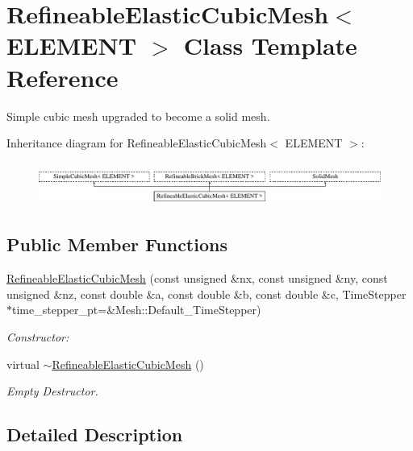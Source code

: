 \hypertarget{classRefineableElasticCubicMesh}{}\section{Refineable\+Elastic\+Cubic\+Mesh$<$ E\+L\+E\+M\+E\+NT $>$ Class Template Reference}
\label{classRefineableElasticCubicMesh}


Simple cubic mesh upgraded to become a solid mesh.  


Inheritance diagram for Refineable\+Elastic\+Cubic\+Mesh$<$ E\+L\+E\+M\+E\+NT $>$\+:\begin{figure}[H]
\begin{center}
\leavevmode
\includegraphics[height=1.419518cm]{classRefineableElasticCubicMesh}
\end{center}
\end{figure}
\subsection*{Public Member Functions}
\begin{DoxyCompactItemize}
\item 
\hyperlink{classRefineableElasticCubicMesh_a99c44a869363c33ed969a94256522b8c}{Refineable\+Elastic\+Cubic\+Mesh} (const unsigned \&nx, const unsigned \&ny, const unsigned \&nz, const double \&a, const double \&b, const double \&c, Time\+Stepper $\ast$time\+\_\+stepper\+\_\+pt=\&Mesh\+::\+Default\+\_\+\+Time\+Stepper)
\begin{DoxyCompactList}\small\item\em Constructor\+: \end{DoxyCompactList}\item 
virtual \hyperlink{classRefineableElasticCubicMesh_a2c0edb5ea4f205077285aced94af5767}{$\sim$\+Refineable\+Elastic\+Cubic\+Mesh} ()
\begin{DoxyCompactList}\small\item\em Empty Destructor. \end{DoxyCompactList}\end{DoxyCompactItemize}


\subsection{Detailed Description}
